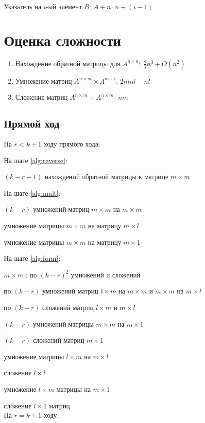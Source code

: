 \documentclass[12pt]{article}
\begin{document}
        Указатель на $i$-ый элемент $B$: $A + n \cdot n + (i - 1)$

        \section{Оценка сложности}
        \begin{enumerate}
            \item Нахождение обратной матрицы для $A^{n \times n}$: $\frac{8}{3}n^3 + O(n^2)$
            \item Умножение матриц $A^{n \times m} \times A^{m \times l}$: $2mnl - nl$
            \item Сложение матриц $A^{n \times m} + A^{n \times m}$: $nm$
        \end{enumerate}

        \subsection{Прямой ход}
        
        На $r < k + 1$ ходу прямого хода:

        На шаге \ref{alg:reverse}: \par
            \quad $(k - r + 1)$ нахождений обратной матрицы к матрице $m \times m$
        
        На шаге \ref{alg:mult}: \par
            \quad $(k - r)$ умножений матриц $m \times m$ на $m \times m$  \par
             умножение матрицы $m \times m$ на матрицу $m \times l$ \par
             умножение матрицы $m \times m$ на матрицу $m \times 1$

        На шаге \ref{alg:form}: \par
            \quad $m \times m$ : по $(k - r)^2$ умножений и сложений        \par
            \quad по $(k - r)$ умножений матриц $l \times m$ на $m \times m$
                                              и $m \times m$ на $m \times l$ \par
            \quad по $(k - r)$ сложений матриц $l \times m$ и $m \times l$   \par
            \quad $(k - r)$ умножений матрицы $m \times m$ на $m \times 1$   \par
            \quad $(k - r)$ сложений матриц $m \times 1$                     \par
             умножение матрицы $l \times m$ на $m \times l$           \par
             сложение $l \times l$                                    \par
             умножение $l \times m$ матрицы на $m \times 1$           \par
             сложение $l \times 1$ матриц                             \\
        На $r = k + 1$ ходу:    
\end{document}
